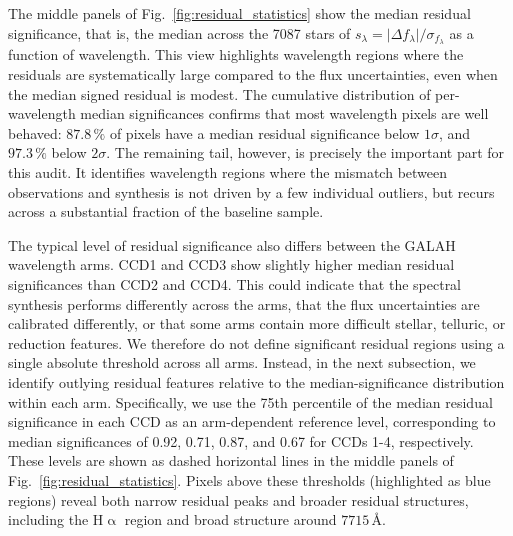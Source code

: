 \documentclass[twocolumn,apj,numberedappendix,appendixfloats]{openjournal}
\begin{document}
The middle panels of Fig.~\ref{fig:residual_statistics} show the median residual significance, that is, the median across the 7087 stars of $s_\lambda = \vert \Delta f_\lambda \vert / \sigma_{f_\lambda}$ as a function of wavelength. This view highlights wavelength regions where the residuals are systematically large compared to the flux uncertainties, even when the median signed residual is modest. The cumulative distribution of per-wavelength median significances confirms that most wavelength pixels are well behaved: $87.8\,\mathrm{\%}$ of pixels have a median residual significance below $1\sigma$, and $97.3\,\mathrm{\%}$ below $2\sigma$. The remaining tail, however, is precisely the important part for this audit. It identifies wavelength regions where the mismatch between observations and synthesis is not driven by a few individual outliers, but recurs across a substantial fraction of the baseline sample.

The typical level of residual significance also differs between the GALAH wavelength arms. CCD1 and CCD3 show slightly higher median residual significances than CCD2 and CCD4. This could indicate that the spectral synthesis performs differently across the arms, that the flux uncertainties are calibrated differently, or that some arms contain more difficult stellar, telluric, or reduction features. We therefore do not define significant residual regions using a single absolute threshold across all arms. Instead, in the next subsection, we identify outlying residual features relative to the median-significance distribution within each arm. Specifically, we use the 75th percentile of the median residual significance in each CCD as an arm-dependent reference level, corresponding to median significances of 0.92, 0.71, 0.87, and 0.67 for CCDs 1-4, respectively. These levels are shown as dashed horizontal lines in the middle panels of Fig.~\ref{fig:residual_statistics}. Pixels above these thresholds (highlighted as blue regions) reveal both narrow residual peaks and broader residual structures, including the $\mathrm{H}\upalpha$ region and broad structure around $7715\,\text{\AA}$.
\end{document}
